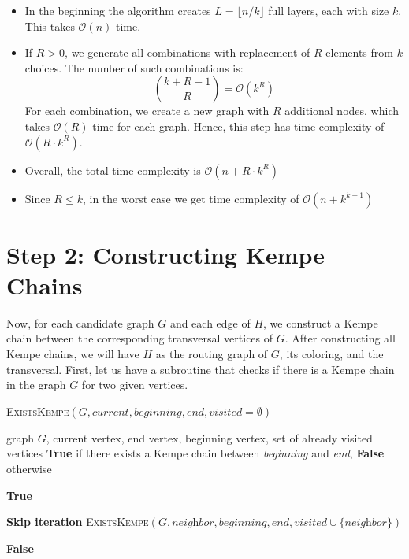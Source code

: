 \begin{itemize}
    \item In the beginning the algorithm creates \( L = \lfloor n / k \rfloor \) full layers, each with size \( k \). This takes \( \mathcal{O}(n) \) time.
    
    \item If \( R > 0 \), we generate all combinations with replacement of \( R \) elements from \( k \) choices. The number of such combinations is:
    \[
        \binom{k + R - 1}{R} = \mathcal{O}(k^R)
    \]
 For each combination, we create a new graph with \( R \) additional nodes, which takes \( \mathcal{O}(R) \) time for each graph. Hence, this step has time complexity of \( \mathcal{O}(R \cdot k^R) \).
    
    \item Overall, the total time complexity is $\mathcal{O}(n + R \cdot k^R)$

    \item Since $R \leq k$, in the worst case we get time complexity of $\mathcal{O}(n + k^{k+1})$
    
\end{itemize}


\section{Step 2: Constructing Kempe Chains}
Now, for each candidate graph $G$ and each edge of $H$, we construct a Kempe chain between the corresponding transversal vertices of $G$. After constructing all Kempe chains, 
we will have $H$ as the routing graph of $G$, its coloring, and the transversal. First, let us have a subroutine that checks if there is a Kempe chain
in the graph $G$ for two given vertices.

\begin{algorithm}[H]
    \caption{\textsc{ExistsKempe}$(G, \textit{current}, \textit{beginning}, \textit{end}, \textit{visited} = \emptyset)$}
    \label{alg:exists-kempe}
    \begin{algorithmic}[1]
    \Require graph $G$, current vertex, end vertex, beginning vertex, set of already visited vertices
    \Ensure \textbf{True} if there exists a Kempe chain between \textit{beginning} and \textit{end}, \textbf{False} otherwise
    
        \State \Return \textbf{True}
    \EndIf
    
            \State \textbf{Skip iteration}
            \State \Return \textsc{ExistsKempe}$(G, \textit{neighbor}, \textit{beginning}, \textit{end}, \textit{visited}  \cup \{\textit{neighbor}\})$
        \EndIf
    \EndFor
    
    \State \Return \textbf{False}
    \end{algorithmic}
    \end{algorithm}


